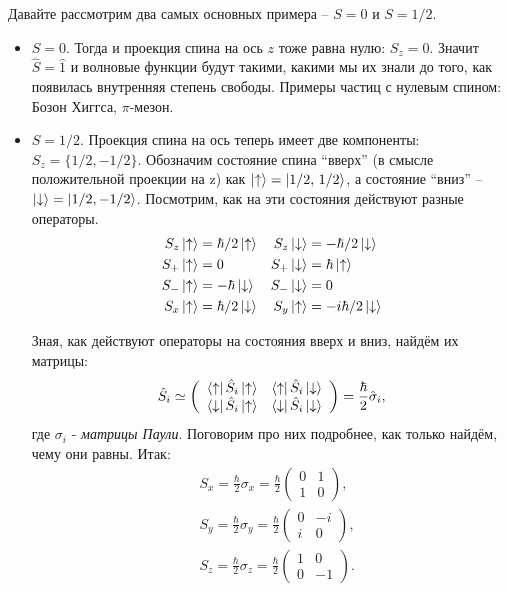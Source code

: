 Давайте рассмотрим два самых основных примера -- $S = 0$ и $S = 1/2$.
\begin{itemize}
    \item $S = 0$. Тогда и проекция спина на ось $z$ тоже равна нулю: $S_z = 0$. Значит $\hat{S} = \hat{1}$ и волновые функции будут такими, какими мы их знали до того, как появилась внутренняя степень свободы. Примеры частиц с нулевым спином: Бозон Хиггса, $\pi$-мезон.
    \item $S = 1/2$. Проекция спина на ось теперь имеет две компоненты: $S_z = \{1/2, -1/2\}$. Обозначим состояние спина ``вверх'' (в смысле положительной проекции на z) как $\ket{\uparrow} = \ket{1/2,\, 1/2}$, а состояние ``вниз'' -- $\ket{\downarrow} = \ket{1/2, -1/2}$. Посмотрим, как на эти состояния действуют разные операторы.
    \begin{align*}
        S_z&\ket{\uparrow} = \hbar/2\ket{\uparrow} & S_z&\ket{\downarrow} = -\hbar/2 \ket{\downarrow}\\
        S_+&\ket{\uparrow} = 0 & S_+&\ket{\downarrow} = \hbar\ket{\uparrow}\\
        S_-&\ket{\uparrow} = -\hbar\ket{\downarrow} & S_-&\ket{\downarrow} = 0\\
        S_x&\ket{\uparrow} =\hbar/2\ket{\downarrow} & S_y&\ket{\uparrow} =-i\hbar/2\ket{\downarrow}
    \end{align*}
    
    Зная, как действуют операторы на состояния вверх и вниз, найдём их матрицы:
    \[
    \hat{S}_i \simeq \left(\begin{array}{cc}
        \bra{\uparrow}\hat{S}_i\ket{\uparrow} & \bra{\uparrow}\hat{S}_i\ket{\downarrow} \\
        \bra{\downarrow}\hat{S}_i\ket{\uparrow}  & \bra{\downarrow}\hat{S}_i\ket{\downarrow}
    \end{array}
    \right) = \frac{\hbar}{2}\hat{\sigma}_i,
    \]
    где $\sigma_i$ - \textit{матрицы Паули}. Поговорим про них подробнее, как только найдём, чему они равны. Итак:
    \begin{align*}
    &S_x = \frac{\hbar}{2}\sigma_x = \frac{\hbar}{2}\left(\begin{array}{cc} 0 & 1\\ 1 & 0 \end{array}\right),\\
    &S_y = \frac{\hbar}{2}\sigma_y = \frac{\hbar}{2}\left(\begin{array}{cc} 0 & -i\\ i & 0 \end{array}\right),\\
    &S_z = \frac{\hbar}{2}\sigma_z = \frac{\hbar}{2}\left(\begin{array}{cc} 1 & 0\\ 0 & -1 \end{array}\right).
    \end{align*}
\end{itemize}

